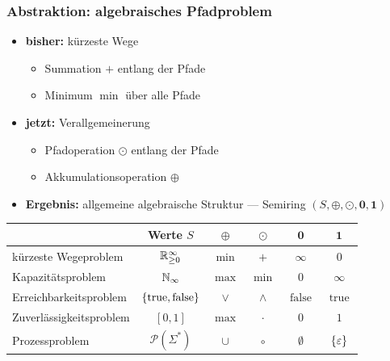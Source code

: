 \documentclass{beamer}
\DeclareMathOperator{\true}{true}
\DeclareMathOperator{\false}{false}
\begin{document}
\begin{frame} \frametitle{Abstraktion: algebraisches Pfadproblem}
	\small
	\begin{itemize}
		\item \textbf{bisher:} kürzeste Wege
		\begin{itemize}
			\item Summation $+$ entlang der Pfade
			\item Minimum $\min$ über alle Pfade
		\end{itemize}
		\item \textbf{jetzt:} Verallgemeinerung
		\begin{itemize}
			\item Pfadoperation $\odot$ entlang der Pfade
			\item Akkumulationsoperation $\oplus$
		\end{itemize}
		\item \textbf{Ergebnis:} allgemeine algebraische Struktur --- Semiring $(S, \oplus, \odot, \mathbf{0}, \mathbf{1})$
	\end{itemize}

	\centering
	
	\begin{tabular}{lccccc}
		\hline
		& Werte $S$ & $\oplus$ & $\odot$ & $\mathbf{0}$ & $\mathbf{1}$ \\
		\hline
		kürzeste Wegeproblem & $\mathbb{R}_{\ge 0}^\infty$ & $\min$ & $+$ & $\infty$ & $0$ \\
		Kapazitätsproblem & $\mathbb{N}_\infty$ & $\max$ & $\min$ & $0$ & $\infty$ \\
		Erreichbarkeitsproblem & $\menge{\true, \false}$ & $\lor$ & $\land$ & $\false$ & $\true$ \\
		Zuverlässigkeitsproblem & $[0,1]$ & $\max$ & $\cdot$ & $0$ & $1$ \\
		Prozessproblem & $\mathcal{P}(\Sigma^\ast)$ & $\cup$ & $\circ$ & $\emptyset$ & $\left\{ \varepsilon \right\}$ \\ \hline
	\end{tabular}
\end{frame}
\end{document}
